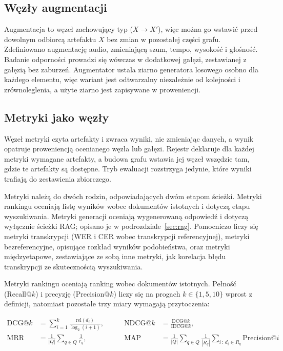 \subsection{Węzły augmentacji}
Augmentacja to węzeł zachowujący typ ($X \rightarrow X'$), więc można go wstawić przed dowolnym
odbiorcą artefaktu $X$ bez zmian w pozostałej części grafu. Zdefiniowano augmentację audio,
zmieniającą szum, tempo, wysokość i głośność.
Badanie odporności prowadzi się wówczas
w dodatkowej gałęzi, zestawianej z gałęzią bez zaburzeń. Augmentator ustala ziarno generatora
losowego osobno dla każdego elementu, więc wariant jest odtwarzalny niezależnie od kolejności i
zrównoleglenia, a użyte ziarno jest zapisywane w proweniencji.

\subsection{Metryki jako węzły}
\label{sec:metryki}
Węzeł metryki czyta artefakty i zwraca wyniki, nie zmieniając danych, a wynik opatruje
proweniencją ocenianego węzła lub gałęzi. Rejestr deklaruje dla każdej metryki wymagane artefakty, a budowa grafu wstawia jej węzeł wszędzie tam,
gdzie te artefakty są dostępne. Tryb ewaluacji rozstrzyga jedynie, które wyniki trafiają do
zestawienia zbiorczego.

Metryki należą do dwóch rodzin, odpowiadających dwóm etapom ścieżki. Metryki rankingu oceniają
listę wyników wobec dokumentów istotnych i dotyczą etapu wyszukiwania. Metryki generacji oceniają
wygenerowaną odpowiedź i dotyczą wyłącznie ścieżki RAG; opisano je w podrozdziale~\ref{sec:rag}.
Pomocniczo liczy się metryki transkrypcji (WER i CER wobec transkrypcji referencyjnej), metryki
bezreferencyjne, opisujące rozkład wyników podobieństwa, oraz metryki międzyetapowe, zestawiające
ze sobą inne metryki, jak korelacja błędu transkrypcji ze skutecznością wyszukiwania.

Metryki rankingu \cite{manning2008introduction, salton1983introduction} oceniają ranking
wobec dokumentów istotnych. Pełność (Recall@$k$) i precyzję (Precision@$k$) liczy się na progach
$k \in \{1,5,10\}$ wprost z definicji, natomiast pozostałe trzy miary wymagają przytoczenia:

\begin{equation}
\begin{aligned}
\text{DCG@}k &= \sum_{i=1}^{k} \frac{\mathrm{rel}(d_i)}{\log_2(i+1)},
&\qquad
\text{NDCG@}k &= \frac{\text{DCG@}k}{\text{IDCG@}k}, \\[4pt]
\text{MRR} &= \frac{1}{|Q|}\sum_{q \in Q} \frac{1}{r_q},
&\qquad
\text{MAP} &= \frac{1}{|Q|}\sum_{q \in Q} \frac{1}{|R_q|}
             \sum_{i \,:\, d_i \in R_q} \text{Precision@}i
\end{aligned}
\label{eq:metrykiIR}
\end{equation}

